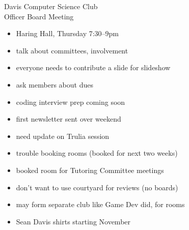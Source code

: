 \documentclass{article}
\begin{document}
\begin{Minutes}{Davis Computer Science Club\\Officer Board Meeting}




\maketitle

\begin{itemize}
\item Haring Hall, Thursday 7:30--9pm
\item talk about committees, involvement
\item everyone needs to contribute a slide for slideshow
\item ask members about dues
\end{itemize}

\begin{itemize}
\item coding interview prep coming soon
\end{itemize}

\begin{itemize}
\item first newsletter sent over weekend
\item need update on Trulia session
\end{itemize}

\begin{itemize}
\item trouble booking rooms (booked for next two weeks)
\item booked room for Tutoring Committee meetings
\item don't want to use courtyard for reviews (no boards)
\item may form separate club like Game Dev did, for rooms
\item Sean Davis shirts starting November
\end{itemize}


\end{Minutes}
\end{document}
